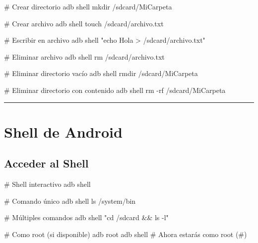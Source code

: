 \documentclass[
  doc,
  floatsintext,
  longtable,
  a4paper,
  nolmodern,
  notxfonts,
  notimes,
  12pt,
  colorlinks=true,linkcolor=blue,citecolor=blue,urlcolor=blue]{apa7}
\newenvironment{Shaded}{\begin{snugshade}}{\end{snugshade}}
\newcommand{\AttributeTok}[1]{\textcolor[rgb]{0.40,0.45,0.13}{#1}}
\newcommand{\CommentTok}[1]{\textcolor[rgb]{0.37,0.37,0.37}{#1}}
\newcommand{\ExtensionTok}[1]{\textcolor[rgb]{0.00,0.23,0.31}{#1}}
\newcommand{\NormalTok}[1]{\textcolor[rgb]{0.00,0.23,0.31}{#1}}
\newcommand{\StringTok}[1]{\textcolor[rgb]{0.13,0.47,0.30}{#1}}
\begin{document}
\begin{Shaded}
\begin{Highlighting}[]
\CommentTok{\# Crear directorio}
\ExtensionTok{adb}\NormalTok{ shell mkdir /sdcard/MiCarpeta}

\CommentTok{\# Crear archivo}
\ExtensionTok{adb}\NormalTok{ shell touch /sdcard/archivo.txt}

\CommentTok{\# Escribir en archivo}
\ExtensionTok{adb}\NormalTok{ shell }\StringTok{"echo \textquotesingle{}Hola\textquotesingle{} \textgreater{} /sdcard/archivo.txt"}

\CommentTok{\# Eliminar archivo}
\ExtensionTok{adb}\NormalTok{ shell rm /sdcard/archivo.txt}

\CommentTok{\# Eliminar directorio vacío}
\ExtensionTok{adb}\NormalTok{ shell rmdir /sdcard/MiCarpeta}

\CommentTok{\# Eliminar directorio con contenido}
\ExtensionTok{adb}\NormalTok{ shell rm }\AttributeTok{{-}rf}\NormalTok{ /sdcard/MiCarpeta}
\end{Highlighting}
\end{Shaded}

\begin{center}\rule{0.5\linewidth}{0.5pt}\end{center}

\section{Shell de Android}\label{shell-de-android}

\subsection{Acceder al Shell}\label{acceder-al-shell}

\begin{Shaded}
\begin{Highlighting}[]
\CommentTok{\# Shell interactivo}
\ExtensionTok{adb}\NormalTok{ shell}

\CommentTok{\# Comando único}
\ExtensionTok{adb}\NormalTok{ shell ls /system/bin}

\CommentTok{\# Múltiples comandos}
\ExtensionTok{adb}\NormalTok{ shell }\StringTok{"cd /sdcard \&\& ls {-}l"}

\CommentTok{\# Como root (si disponible)}
\ExtensionTok{adb}\NormalTok{ root}
\ExtensionTok{adb}\NormalTok{ shell}
\CommentTok{\# Ahora estarás como root (\#)}
\end{Highlighting}
\end{Shaded}
\end{document}
